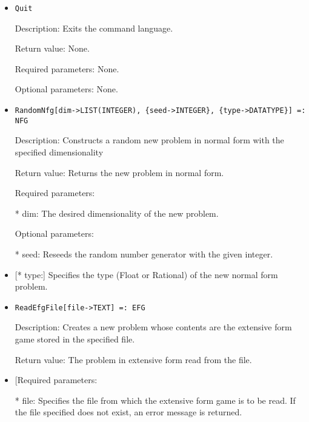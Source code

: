 \begin{itemize}
\item

\begin{verbatim}
Quit
\end{verbatim}

\bd

\item
[Description:] Exits the command language.
\item
[Return value:] None.
\item
[Required parameters:] None.
\item
[Optional parameters:] None.
\ed

\item

\begin{verbatim}
RandomNfg[dim->LIST(INTEGER), {seed->INTEGER}, {type->DATATYPE}] =: NFG
\end{verbatim}

\bd
\item
[Description:] Constructs a random new problem in normal form with the 
specified dimensionality
\item
[Return value:] Returns the new problem in normal form.
\item
[Required parameters:]\hfil\null
	
\bd
\item
[* dim:] The desired dimensionality of the new problem.
\ed

\item
[Optional parameters:]\hfil\null
	
\bd
\item
[* seed:] Reseeds the random number generator with the given integer.
\item

[* type:] Specifies the type (Float or Rational) of the new normal 
form problem.
\ed
\ed

\item
\begin{verbatim}
ReadEfgFile[file->TEXT] =: EFG
\end{verbatim}

\bd
\item
[Description:] Creates a new problem whose contents are the extensive 
form game stored in the specified file.
\item
[Return value:] The problem in extensive form read from the file.
\item

[Required parameters:

\bd
\item
[* file:] Specifies the file from which the extensive form game is to
be read.  If the file specified does not exist, an error 
message is returned.
\ed


\end{itemize}
